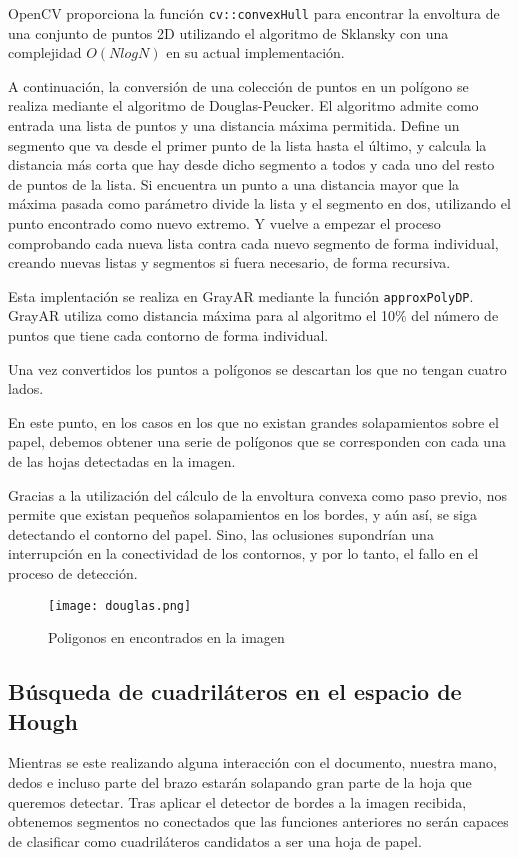 OpenCV proporciona la función \texttt{cv::convexHull} para encontrar la envoltura de una conjunto de puntos 2D utilizando el algoritmo de Sklansky con una complejidad $O(N log N)$ en su actual implementación.

A continuación, la conversión de una colección de puntos en un polígono se realiza mediante el algoritmo de Douglas-Peucker. El algoritmo admite como entrada una lista de puntos y una distancia máxima permitida. Define un segmento que va desde el primer punto de la lista hasta el último, y calcula la distancia más corta que hay desde dicho segmento a todos y cada uno del resto de puntos de la lista. Si encuentra un punto a una distancia mayor que la máxima pasada como parámetro divide la lista y el segmento en dos, utilizando el punto encontrado como nuevo extremo. Y vuelve a empezar el proceso comprobando cada nueva lista contra cada nuevo segmento de forma individual, creando nuevas listas y segmentos si fuera necesario, de forma recursiva.

Esta implentación se realiza en GrayAR mediante la función \texttt{approxPolyDP}. GrayAR utiliza como distancia máxima para al algoritmo el 10\% del número de puntos que tiene cada contorno de forma individual.

Una vez convertidos los puntos a polígonos se descartan los que no tengan cuatro lados. 

En este punto, en los casos en los que no existan grandes solapamientos sobre el papel, debemos obtener una serie de polígonos que se corresponden con cada una de las hojas detectadas en la imagen.

Gracias a la utilización del cálculo de la envoltura convexa como paso previo, nos permite que existan pequeños solapamientos en los bordes, y aún así, se siga detectando el contorno del papel. Sino, las oclusiones supondrían una interrupción en la conectividad de los contornos, y por lo tanto, el fallo en el proceso de detección.

\begin{figure}[h] 
  \centering
  \texttt{[image: douglas.png]}
  \caption{Poligonos en encontrados en la imagen}
  \label{fig:douglas}
\end{figure}

\subsection{Búsqueda de cuadriláteros en el espacio de Hough}
Mientras se este realizando alguna interacción con el documento, nuestra mano, dedos e incluso parte del brazo estarán solapando gran parte de la hoja que queremos detectar. Tras aplicar el detector de bordes a la imagen recibida, obtenemos segmentos no conectados que las funciones anteriores no serán capaces de clasificar como cuadriláteros candidatos a ser una hoja de papel.

